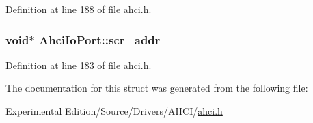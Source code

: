 Definition at line 188 of file ahci.\+h.

\subsubsection[{\texorpdfstring{scr\+\_\+addr}{scr_addr}}]{\setlength{\rightskip}{0pt plus 5cm}void$\ast$ Ahci\+Io\+Port\+::scr\+\_\+addr}\hypertarget{structAhciIoPort_a5f15bb2db00d1bcfee213b59a0477452}{}\label{structAhciIoPort_a5f15bb2db00d1bcfee213b59a0477452}


Definition at line 183 of file ahci.\+h.



The documentation for this struct was generated from the following file\+:\begin{DoxyCompactItemize}
\item 
Experimental Edition/\+Source/\+Drivers/\+A\+H\+C\+I/\hyperlink{ahci_8h}{ahci.\+h}\end{DoxyCompactItemize}
